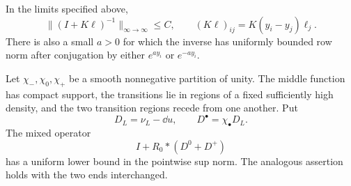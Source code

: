 \begin{lemma}
\label{lem:gaudin-inverse}
In the limits specified above,
\begin{equation}\label{eq:Gaudin-sup-inverse}
 \|(I+K\ell)^{-1}\|_{\infty\to\infty}\le C,\qquad
 (K\ell)_{ij}=K(y_i-y_j)\ell_j.
\end{equation}
There is also a small $a>0$ for which the inverse has uniformly
bounded row norm after conjugation by either $e^{ay_i}$ or
$e^{-ay_i}$.

Let $\chi_-,\chi_0,\chi_+$ be a smooth nonnegative partition of
unity.  The middle function has compact support, the transitions
lie in regions of a fixed sufficiently high density, and the two
transition regions recede from one another.  Put
\[
 D_L=\nu_L-\dd u,\qquad D^\bullet=\chi_\bullet D_L.
\]
The mixed operator
\begin{equation}\label{eq:mixed-operator}
 I+R_0*(D^0+D^+)
\end{equation}
has a uniform lower bound in the pointwise sup norm.
The analogous assertion holds with the two ends interchanged.
\end{lemma}

